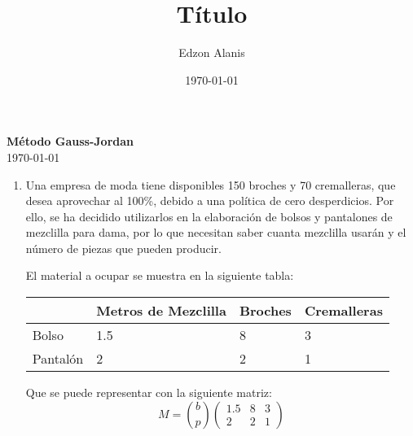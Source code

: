 \documentclass[12pt]{article}
\title{Título}
\author{Edzon Alanis}
\date{\today}
\begin{document}
\maketitle

\begin{center}
    \textbf{\Large Método Gauss-Jordan}\\[0.5cm]
    \today
\end{center}

\begin{enumerate}
    \item Una empresa de moda tiene disponibles 150 broches y 70 cremalleras, que desea aprovechar al 100\%, debido a una política de cero desperdicios. Por ello, se ha decidido utilizarlos en la elaboración de bolsos y pantalones de mezclilla para dama, por lo que necesitan saber cuanta mezclilla usarán y el número de piezas que pueden producir.
    
    El material a ocupar se muestra en la siguiente tabla: 
    \begin{table}[h]
        \centering
        \begin{tabular}{l|l|l|l|}
        \cline{2-4}
                                    & Metros de Mezclilla & Broches & Cremalleras \\ \hline
        \multicolumn{1}{|l|}{Bolso}    & 1.5                 & 8       & 3           \\ \hline
        \multicolumn{1}{|l|}{Pantalón} & 2                   & 2       & 1           \\ \hline
        \end{tabular}
        \end{table}

        Que se puede representar con la siguiente matriz:
        \[M = \binom{b}{p} \begin{pmatrix}
            1.5 & 8 & 3 \\
            2 & 2 & 1
        \end{pmatrix}\]
\end{enumerate}


\end{document}
